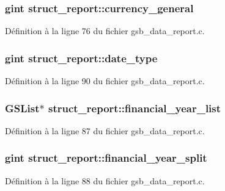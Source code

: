 \subsubsection[{currency\_\-general}]{\setlength{\rightskip}{0pt plus 5cm}gint {\bf struct\_\-report::currency\_\-general}}\label{structstruct__report_a558b6ad9bfc3d899fd53ad991a8e3517}


Définition à la ligne 76 du fichier gsb\_\-data\_\-report.c.

\subsubsection[{date\_\-type}]{\setlength{\rightskip}{0pt plus 5cm}gint {\bf struct\_\-report::date\_\-type}}\label{structstruct__report_aa87ebc3bb0bf40b66b52e5332b2468fb}


Définition à la ligne 90 du fichier gsb\_\-data\_\-report.c.

\subsubsection[{financial\_\-year\_\-list}]{\setlength{\rightskip}{0pt plus 5cm}GSList$\ast$ {\bf struct\_\-report::financial\_\-year\_\-list}}\label{structstruct__report_af513506e7cf17cd5a2eecbcf10602881}


Définition à la ligne 87 du fichier gsb\_\-data\_\-report.c.

\subsubsection[{financial\_\-year\_\-split}]{\setlength{\rightskip}{0pt plus 5cm}gint {\bf struct\_\-report::financial\_\-year\_\-split}}\label{structstruct__report_a94600058385b2389317c68e1b2145d2a}


Définition à la ligne 88 du fichier gsb\_\-data\_\-report.c.

